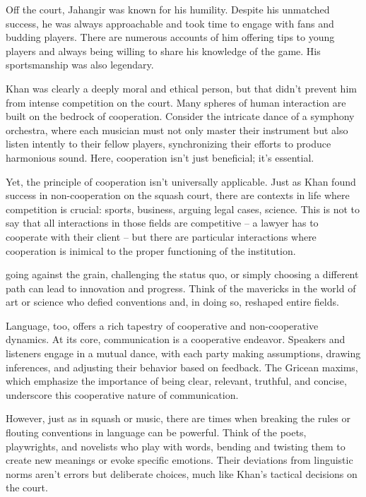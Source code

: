 Off the court, Jahangir was known for his humility. Despite his unmatched success, he was always approachable and took time to engage with fans and budding players. There are numerous accounts of him offering tips to young players and always being willing to share his knowledge of the game. His sportsmanship was also legendary. 

Khan was clearly a deeply moral and ethical person, but that didn't prevent him from intense competition on the court. Many spheres of human interaction are built on the bedrock of cooperation. Consider the intricate dance of a symphony orchestra, where each musician must not only master their instrument but also listen intently to their fellow players, synchronizing their efforts to produce harmonious sound. Here, cooperation isn't just beneficial; it's essential.

Yet, the principle of cooperation isn't universally applicable. Just as Khan found success in non-cooperation on the squash court, there are contexts in life where competition is crucial: sports, business, arguing legal cases, science. This is not to say that all interactions in those fields are competitive -- a lawyer has to cooperate with their client -- but there are particular interactions where cooperation is inimical to the proper functioning of the institution.

going against the grain, challenging the status quo, or simply choosing a different path can lead to innovation and progress. Think of the mavericks in the world of art or science who defied conventions and, in doing so, reshaped entire fields.

Language, too, offers a rich tapestry of cooperative and non-cooperative dynamics. At its core, communication is a cooperative endeavor. Speakers and listeners engage in a mutual dance, with each party making assumptions, drawing inferences, and adjusting their behavior based on feedback. The Gricean maxims, which emphasize the importance of being clear, relevant, truthful, and concise, underscore this cooperative nature of communication.

However, just as in squash or music, there are times when breaking the rules or flouting conventions in language can be powerful. Think of the poets, playwrights, and novelists who play with words, bending and twisting them to create new meanings or evoke specific emotions. Their deviations from linguistic norms aren't errors but deliberate choices, much like Khan's tactical decisions on the court.

